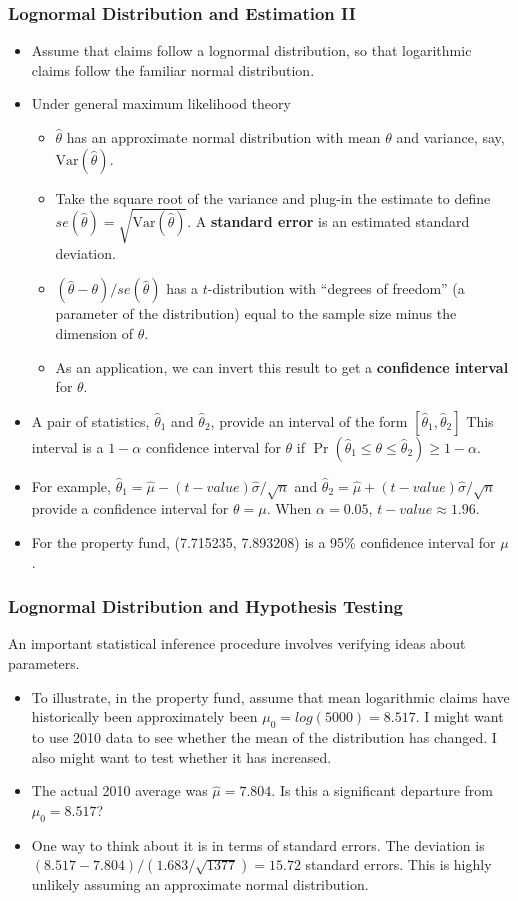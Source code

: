 \documentclass{beamer}
\begin{document}
\begin{frame}[shrink=2]
\frametitle{Lognormal Distribution and Estimation II}
\begin{itemize}
\item Assume that claims follow a lognormal distribution, so that logarithmic claims follow the familiar normal distribution.
\item Under general maximum likelihood theory
\begin{itemize}
\item $\hat{\theta}$ has an approximate normal distribution with mean $\theta$ and variance, say, $\mathrm{Var}(\hat{\theta})$.
\item Take the square root of the variance and plug-in the estimate to define $se(\hat{\theta}) = \sqrt{\mathrm{Var}(\hat{\theta})}$. A \textbf{standard error} is an estimated standard deviation.
\item $ (\hat{\theta}-\theta)/se(\hat{\theta})$
has a $t$-distribution with ``degrees of freedom'' (a parameter of the distribution) equal to the sample size minus the dimension of  $\theta$.
\item As an application, we can invert this result to get a \textbf{confidence interval} for $\theta$.
\end{itemize}
\item A pair of statistics, $\hat{\theta}_1$ and $\hat{\theta}_2$, provide an interval of the form $[\hat{\theta}_1, \hat{\theta}_2]$ This interval is a $1-\alpha$ confidence interval for $\theta$ if $\Pr\left(\hat{\theta}_1 \le \theta \le \hat{\theta}_2\right) \ge 1-\alpha.$
\item For example, $\hat{\theta}_1 = \hat{\mu} - (t-value) \hat{\sigma}/\sqrt{n}$ and $\hat{\theta}_2 = \hat{\mu} + (t-value) \hat{\sigma}/\sqrt{n}$ provide a confidence interval for $\theta=\mu$. When $\alpha = 0.05$, $t-value \approx 1.96$.
\item For the property fund, (7.715235, 7.893208) is a 95\% confidence interval for $\mu$.
\end{itemize}
\end{frame}

\begin{frame}[shrink=2]
\frametitle{Lognormal Distribution and Hypothesis Testing}
An important statistical inference procedure involves verifying ideas about parameters.
\begin{itemize}
\item To illustrate, in the property fund, assume that mean logarithmic claims have historically been approximately been $\mu_0 = log(5000)= 8.517$. I might want to use 2010 data to see whether the mean of the distribution has changed. I also might want to test whether it has increased.
\item The actual 2010 average was $\hat{\mu} =7.804$. Is this a significant departure from $\mu_0 = 8.517$?
\item One way to think about it is in terms of standard errors. The deviation is $(8.517-7.804)/(1.683/\sqrt{1377}) = 15.72$ standard errors. This is highly unlikely assuming an approximate normal distribution.
\end{itemize}
\end{frame}
\end{document}

